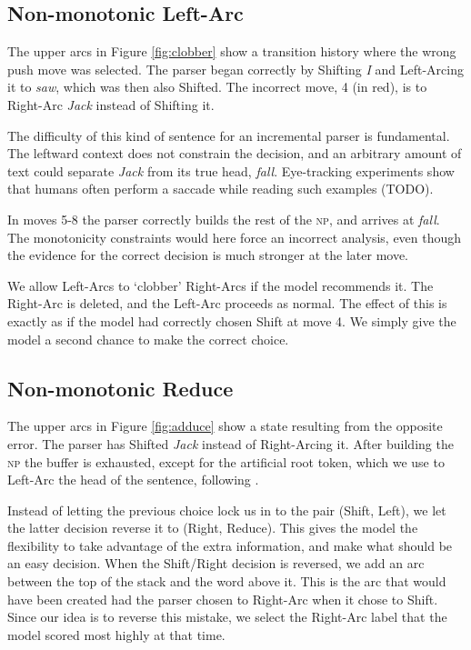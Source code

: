 \documentclass[11pt,letterpaper]{article}
\begin{document}
\subsection{Non-monotonic Left-Arc}

The upper arcs in Figure \ref{fig:clobber} show a transition history where the wrong
push move was selected. The parser began correctly by Shifting \emph{I}
and Left-Arcing it to \emph{saw}, which was then also Shifted. The incorrect move,
4 (in red), is to Right-Arc \emph{Jack} instead of Shifting it.

The difficulty of this kind of sentence for an incremental parser is fundamental.
The leftward context does not constrain the decision, 
and an arbitrary amount of text could separate \emph{Jack} from its true head,
\emph{fall}. Eye-tracking
experiments show that humans often perform a saccade while reading such examples (TODO).

In moves 5-8 the parser correctly builds the rest of the \textsc{np}, and arrives
at \emph{fall}. The monotonicity constraints would here force an incorrect analysis,
even though the evidence for the correct decision is much stronger at the later move.

We allow Left-Arcs to `clobber' Right-Arcs if the model
recommends it. The Right-Arc is deleted, and the Left-Arc proceeds as normal. The
effect of this is exactly as if the model had correctly chosen Shift at
move 4. We simply give the model a second chance to make the correct choice.

\subsection{Non-monotonic Reduce}

The upper arcs in Figure \ref{fig:adduce} show a state resulting from the opposite error.
The parser has Shifted \emph{Jack} instead of Right-Arcing it. After
building the \textsc{np} the buffer is exhausted, except for the artificial root token,
which we use to Left-Arc the head of the sentence, following \citet{nivre:squib}.

Instead of letting the previous choice lock us in to the pair (Shift, Left), we let
the latter decision reverse it to (Right, Reduce). This gives the model the flexibility
to take advantage of the extra information, and make what should be an easy decision.
When the Shift/Right decision is reversed, we add an arc between the top of the stack
and the word above it. This is the arc that would have been created had the parser
chosen to Right-Arc when it chose to Shift. Since our idea is to reverse this mistake,
we select the Right-Arc label that the model scored most highly at that time.
\end{document}
